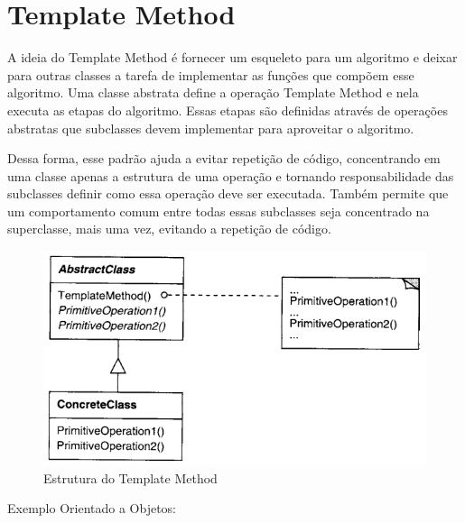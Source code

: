 \section{Template Method}

A ideia do Template Method é fornecer um esqueleto para um algoritmo 
e deixar para outras classes a tarefa de implementar as funções que 
compõem esse algoritmo. Uma classe abstrata define a operação Template 
Method e nela executa as etapas do algoritmo. Essas etapas são definidas 
através de operações abstratas que subclasses devem implementar para 
aproveitar o algoritmo.

Dessa forma, esse padrão ajuda a evitar repetição de código, concentrando 
em uma classe apenas a estrutura de uma operação e tornando responsabilidade 
das subclasses definir como essa operação deve ser executada. Também permite 
que um comportamento comum entre todas essas subclasses seja concentrado 
na superclasse, mais uma vez, evitando a repetição de código.

\begin{figure}[htb]
	\caption{\label{fig_grafico}Estrutura do Template Method}
	\begin{center}
	    \includegraphics[scale=0.5]{5_padroes-contexto-funcional/5.3_comportamentais/5.3.10_template-method/diagram.png}
	\end{center}
\end{figure}

Exemplo Orientado a Objetos:

